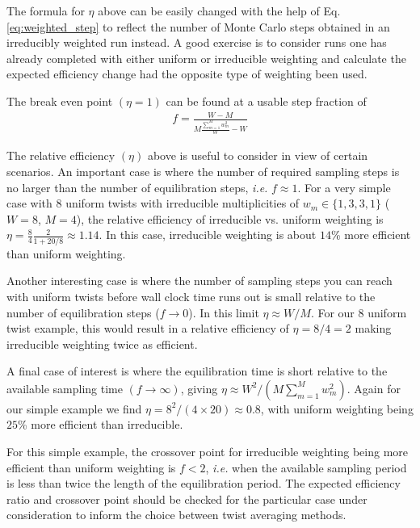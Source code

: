The formula for $\eta$ above can be easily changed with the help of 
Eq. \ref{eq:weighted_step} to reflect the 
number of Monte Carlo steps obtained in an irreducibly weighted run 
instead.  A good exercise is to consider runs one has already completed 
with either uniform or irreducible weighting and calculate the 
expected efficiency change had the opposite type of weighting been used.

The break even point $(\eta=1)$ can be found at a usable step fraction of 
\begin{align}
  f=\frac{W-M}{M\frac{\sum_{m=1}^Mw_m^2}{W}-W}
\end{align}

The relative efficiency $(\eta)$ above is useful to consider in view of certain 
scenarios.  An important case is where the number of required sampling 
steps is no larger than the number of equilibration steps, \emph{i.e.} 
$f\approx 1$.  For a very simple case with 8 uniform twists with 
irreducible multiplicities of $w_m\in\{1,3,3,1\}$ ($W=8$, $M=4$), the 
relative efficiency of irreducible vs. uniform weighting is 
$\eta=\frac{8}{4}\frac{2}{1+20/8}\approx 1.14$.  In this case, 
irreducible weighting is about $14$\% more efficient than uniform weighting.

Another interesting case is where the number of sampling steps you can 
reach with uniform twists before wall clock time runs out is small 
relative to the number of equilibration steps ($f\rightarrow 0$). 
In this limit $\eta\approx W/M$.  For our 8 uniform twist example, this would 
result in a relative efficiency of $\eta=8/4=2$ making irreducible 
weighting twice as efficient.

A final case of interest is where the equilibration time is short 
relative to the available sampling time $(f\rightarrow\infty)$, 
giving $\eta\approx W^2/(M\sum_{m=1}^Mw_m^2)$.  Again for our simple example 
we find $\eta=8^2/(4\times 20)\approx 0.8$, with uniform weighting being 
$25$\% more efficient than irreducible.  

For this simple example, the crossover point for irreducible weighting being 
more efficient than uniform weighting is $f<2$, \emph{i.e.} when the 
available sampling period is less than twice the length of the equilibration 
period.  The expected efficiency ratio and crossover point should be checked 
for the particular case under consideration to inform the choice between   
twist averaging methods.



